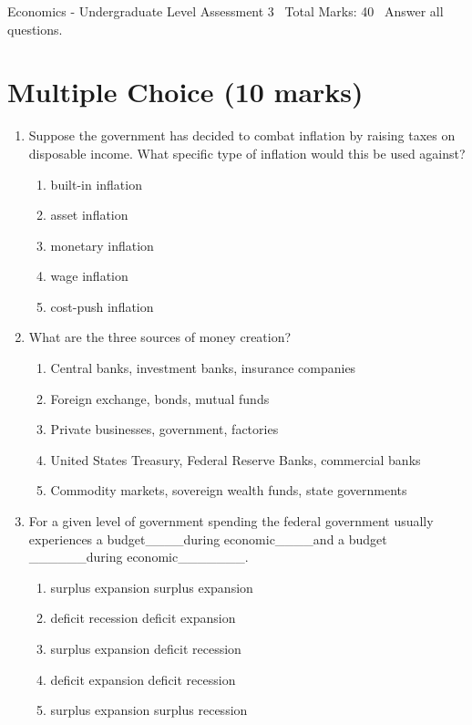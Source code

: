 \documentclass[12pt]{article}
\begin{document}
\begin{center}
Economics - Undergraduate Level Assessment 3 \
Total Marks: 40 \
Answer all questions.
\end{center}

\section*{Multiple Choice (10 marks)}
\begin{enumerate}[label=\arabic*.]
\item Suppose the government has decided to combat inflation by raising taxes on disposable
income. What specific type of inflation would this be used against?
\begin{enumerate}[label=(\alph*)]
    \item built-in inflation
    \item asset inflation
    \item monetary inflation
    \item wage inflation
    \item cost-push inflation
\end{enumerate}
\item What are the three sources of money creation?
\begin{enumerate}[label=(\alph*)]
    \item Central banks, investment banks, insurance companies
    \item Foreign exchange, bonds, mutual funds
    \item Private businesses, government, factories
    \item United States Treasury, Federal Reserve Banks, commercial banks
    \item Commodity markets, sovereign wealth funds, state governments
\end{enumerate}
\item For a given level of government spending the federal government usually experiences a
budget\_\_\_\_during economic\_\_\_\_and a budget \_\_\_\_\_\_during economic\_\_\_\_\_\_\_.
\begin{enumerate}[label=(\alph*)]
    \item surplus expansion surplus expansion
    \item deficit recession deficit expansion
    \item surplus expansion deficit recession
    \item deficit expansion deficit recession
    \item surplus expansion surplus recession

\end{enumerate}
\end{enumerate}
\end{document}
